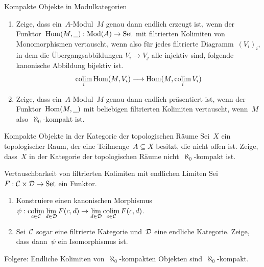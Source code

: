 \documentclass{uebblatt}
\begin{document}

\vspace{-0.1em}
\begin{aufgabe}{Kompakte Objekte in Modulkategorien}
\begin{enumerate}
\item Zeige, dass ein~$A$-Modul~$M$ genau dann endlich erzeugt ist, wenn der
Funktor~$\mathrm{Hom}(M,\underline{\ \ }) : \mathrm{Mod}(A) \to \mathrm{Set}$ mit filtrierten
Kolimiten von Monomorphismen vertauscht, wenn also für jedes filtrierte
Diagramm~$(V_i)_i$, in dem die Über\-gangs\-ab\-bil\-dun\-gen $V_i \to V_j$ alle injektiv
sind, folgende kanonische Abbildung bijektiv ist. \\[-0.5em]
\[ \operatorname*{colim}_i \mathrm{Hom}(M,V_i) \longrightarrow \mathrm{Hom}(M, \operatorname*{colim}_i V_i) \]
\vspace{-1.0em}
\item Zeige, dass ein~$A$-Modul~$M$ genau dann endlich präsentiert ist, wenn
der Funktor~$\mathrm{Hom}(M,\underline{\ \ })$ mit beliebigen filtrierten Kolimiten
vertauscht, wenn~$M$ also~$\aleph_0$-kompakt ist.
\end{enumerate}
\end{aufgabe}

\begin{aufgabe}{Kompakte Objekte in der Kategorie der topologischen Räume}
Sei~$X$ ein topologischer Raum, der eine Teilmenge~$A \subseteq X$ besitzt, die
nicht offen ist. Zeige, dass~$X$ in der Kategorie der topologischen Räume
nicht~$\aleph_0$-kompakt ist.
\end{aufgabe}

\begin{aufgabe}{Vertauschbarkeit von filtrierten Kolimiten mit endlichen Limiten}
Sei~$F : \mathcal{C} \times \mathcal{D} \to \mathrm{Set}$ ein Funktor.
\begin{enumerate}
\item Konstruiere einen kanonischen Morphismus~$\psi : \operatorname*{colim}\limits_{c \in \mathcal{C}}
\lim\limits_{d \in \mathcal{D}} F(c,d) \to \lim\limits_{d \in \mathcal{D}} \operatorname*{colim}\limits_{c \in \mathcal{C}} F(c,d)$.
\item Sei~$\mathcal{C}$ sogar eine filtrierte Kategorie und~$\mathcal{D}$ eine endliche Kategorie. Zeige, dass dann~$\psi$ ein Isomorphismus ist.
\end{enumerate}
Folgere: Endliche Kolimiten von~$\aleph_0$-kompakten Objekten
sind~$\aleph_0$-kompakt.
\end{aufgabe}
\end{document}
